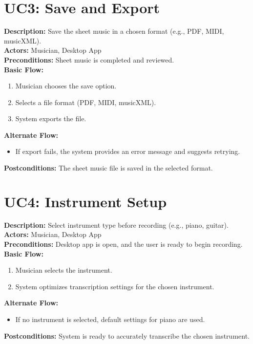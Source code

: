 \documentclass[12pt]{article}
\begin{document}
\section*{UC3: Save and Export}
\textbf{Description:} Save the sheet music in a chosen format (e.g., PDF, MIDI, musicXML). \\
\textbf{Actors:} Musician, Desktop App \\
\textbf{Preconditions:} Sheet music is completed and reviewed. \\
\textbf{Basic Flow:}
\begin{enumerate}
    \item Musician chooses the save option.
    \item Selects a file format (PDF, MIDI, musicXML).
    \item System exports the file.
\end{enumerate}
\textbf{Alternate Flow:}
\begin{itemize}
    \item If export fails, the system provides an error message and suggests retrying.
\end{itemize}
\textbf{Postconditions:} The sheet music file is saved in the selected format.

\section*{UC4: Instrument Setup}
\textbf{Description:} Select instrument type before recording (e.g., piano, guitar). \\
\textbf{Actors:} Musician, Desktop App \\
\textbf{Preconditions:} Desktop app is open, and the user is ready to begin recording. \\
\textbf{Basic Flow:}
\begin{enumerate}
    \item Musician selects the instrument.
    \item System optimizes transcription settings for the chosen instrument.
\end{enumerate}
\textbf{Alternate Flow:}
\begin{itemize}
    \item If no instrument is selected, default settings for piano are used.
\end{itemize}
\textbf{Postconditions:} System is ready to accurately transcribe the chosen instrument.
\end{document}
